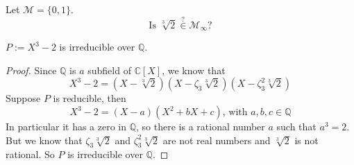 
\begin{frame}
    \begin{problem}
        Let $\mathcal{M} = \{0,1\}$.  
        $$\text{Is }\sqrt[3]{2} \overset{?}{\in} \mathcal{M}_{\infty}?$$
    \end{problem}
\end{frame}

\begin{frame}
    \begin{lemma}
        $P := X^3 - 2$ is irreducible over $\mathbb{Q}$.
    \label{lem:irreducible_over_Q}
    \leanok
    \end{lemma}
    \begin{proof}
        \leanok
        Since $\mathbb{Q}$ is $a$ subfield of $\mathbb{C} [X]$, we know that
        \begin{equation*}
            X^3 - 2 = (X - \sqrt[3]{2})(X -\zeta_3 \sqrt[3]{2})(X -\zeta_3^2 \sqrt[3]{2})
        \end{equation*}
        Suppose $P$ is reducible, then
        \begin{equation*}
            X^3 - 2 = (X - a)(X^2 + bX + c)\text{, with } a, b, c \in \mathbb{Q}
        \end{equation*}
        In particular it has a zero in $\mathbb{Q}$, so there is a rational number $a$ such that $a^3 = 2$.\newline
        But we know that $\zeta_3 \sqrt[3]{2}$ and $\zeta_3^2 \sqrt[3]{2}$ are not real numbers and $\sqrt[3]{2}$ is not rational.
        So $P$ is irreducible over $\mathbb{Q}$.
    \end{proof}
\end{frame}

